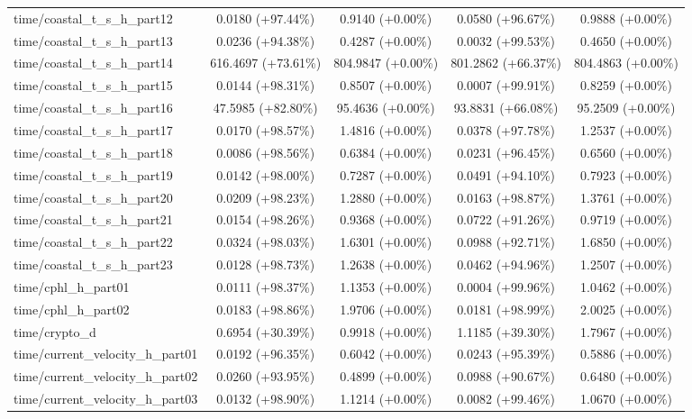 \begin{table}[htbp]
{\begin{tabular}{lcccc}
time/coastal\_t\_s\_h\_part12 & 0.0180 (+97.44\%) & 0.9140 (+0.00\%) & 0.0580 (+96.67\%) & 0.9888 (+0.00\%) \\
time/coastal\_t\_s\_h\_part13 & 0.0236 (+94.38\%) & 0.4287 (+0.00\%) & 0.0032 (+99.53\%) & 0.4650 (+0.00\%) \\
time/coastal\_t\_s\_h\_part14 & 616.4697 (+73.61\%) & 804.9847 (+0.00\%) & 801.2862 (+66.37\%) & 804.4863 (+0.00\%) \\
time/coastal\_t\_s\_h\_part15 & 0.0144 (+98.31\%) & 0.8507 (+0.00\%) & 0.0007 (+99.91\%) & 0.8259 (+0.00\%) \\
time/coastal\_t\_s\_h\_part16 & 47.5985 (+82.80\%) & 95.4636 (+0.00\%) & 93.8831 (+66.08\%) & 95.2509 (+0.00\%) \\
time/coastal\_t\_s\_h\_part17 & 0.0170 (+98.57\%) & 1.4816 (+0.00\%) & 0.0378 (+97.78\%) & 1.2537 (+0.00\%) \\
time/coastal\_t\_s\_h\_part18 & 0.0086 (+98.56\%) & 0.6384 (+0.00\%) & 0.0231 (+96.45\%) & 0.6560 (+0.00\%) \\
time/coastal\_t\_s\_h\_part19 & 0.0142 (+98.00\%) & 0.7287 (+0.00\%) & 0.0491 (+94.10\%) & 0.7923 (+0.00\%) \\
time/coastal\_t\_s\_h\_part20 & 0.0209 (+98.23\%) & 1.2880 (+0.00\%) & 0.0163 (+98.87\%) & 1.3761 (+0.00\%) \\
time/coastal\_t\_s\_h\_part21 & 0.0154 (+98.26\%) & 0.9368 (+0.00\%) & 0.0722 (+91.26\%) & 0.9719 (+0.00\%) \\
time/coastal\_t\_s\_h\_part22 & 0.0324 (+98.03\%) & 1.6301 (+0.00\%) & 0.0988 (+92.71\%) & 1.6850 (+0.00\%) \\
time/coastal\_t\_s\_h\_part23 & 0.0128 (+98.73\%) & 1.2638 (+0.00\%) & 0.0462 (+94.96\%) & 1.2507 (+0.00\%) \\
time/cphl\_h\_part01 & 0.0111 (+98.37\%) & 1.1353 (+0.00\%) & 0.0004 (+99.96\%) & 1.0462 (+0.00\%) \\
time/cphl\_h\_part02 & 0.0183 (+98.86\%) & 1.9706 (+0.00\%) & 0.0181 (+98.99\%) & 2.0025 (+0.00\%) \\
time/crypto\_d & 0.6954 (+30.39\%) & 0.9918 (+0.00\%) & 1.1185 (+39.30\%) & 1.7967 (+0.00\%) \\
time/current\_velocity\_h\_part01 & 0.0192 (+96.35\%) & 0.6042 (+0.00\%) & 0.0243 (+95.39\%) & 0.5886 (+0.00\%) \\
time/current\_velocity\_h\_part02 & 0.0260 (+93.95\%) & 0.4899 (+0.00\%) & 0.0988 (+90.67\%) & 0.6480 (+0.00\%) \\
time/current\_velocity\_h\_part03 & 0.0132 (+98.90\%) & 1.1214 (+0.00\%) & 0.0082 (+99.46\%) & 1.0670 (+0.00\%) \\

\end{tabular}}
\end{table}
